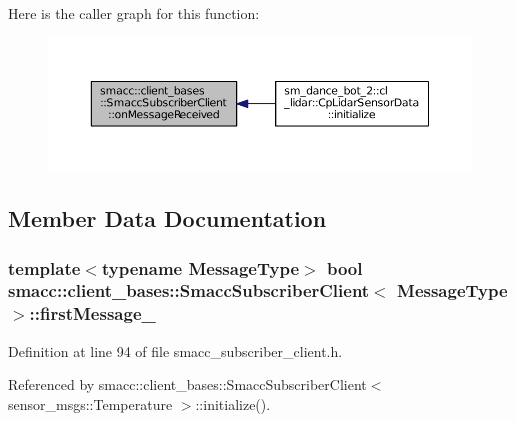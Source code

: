Here is the caller graph for this function\+:
\nopagebreak
\begin{figure}[H]
\begin{center}
\leavevmode
\includegraphics[width=350pt]{classsmacc_1_1client__bases_1_1SmaccSubscriberClient_a4f02251e3a161fb6d802b154b1081f18_icgraph}
\end{center}
\end{figure}




\subsection{Member Data Documentation}
\subsubsection[{\texorpdfstring{first\+Message\+\_\+}{firstMessage_}}]{\setlength{\rightskip}{0pt plus 5cm}template$<$typename Message\+Type$>$ {\bf bool} {\bf smacc\+::client\+\_\+bases\+::\+Smacc\+Subscriber\+Client}$<$ Message\+Type $>$\+::first\+Message\+\_\+\hspace{0.3cm}{\ttfamily [private]}}\hypertarget{classsmacc_1_1client__bases_1_1SmaccSubscriberClient_a1283e89a0d33a9028a5042519c6869a6}{}\label{classsmacc_1_1client__bases_1_1SmaccSubscriberClient_a1283e89a0d33a9028a5042519c6869a6}


Definition at line 94 of file smacc\+\_\+subscriber\+\_\+client.\+h.



Referenced by smacc\+::client\+\_\+bases\+::\+Smacc\+Subscriber\+Client$<$ sensor\+\_\+msgs\+::\+Temperature $>$\+::initialize().

